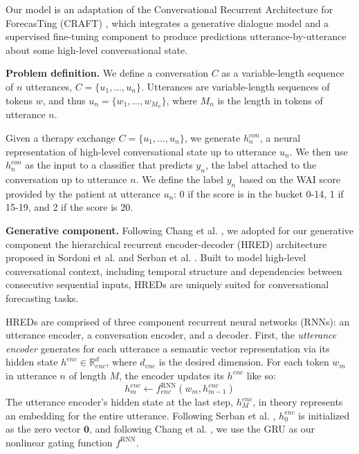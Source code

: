 \documentclass{article}
\begin{document}



Our model is an adaptation of the Conversational Recurrent Architecture for ForecasTing (CRAFT) \cite{Chang-Trouble:19}, which integrates a generative dialogue model and a supervised fine-tuning component to produce predictions utterance-by-utterance about some high-level conversational state.

\textbf{Problem definition.} We define a conversation $C$ as a variable-length sequence of $n$ utterances, $C=\{u_1,...,u_n\}$. Utterances are variable-length sequences of tokens $w$, and thus $u_n=\{w_1,...,w_{M_n}\}$, where $M_n$ is the length in tokens of utterance $n$.

Given a therapy exchange $C=\{u_1,...,u_n\}$, we generate $h^{con}_n$, a neural representation of high-level conversational state up to utterance $u_n$. We then use $h^{con}_n$ as the input to a classifier that predicts $y_n$, the label attached to the conversation up to utterance $n$. We define the label $y_n$ based on the WAI score provided by the patient at utterance $u_n$: 0 if the score is in the bucket 0-14, 1 if 15-19, and 2 if the score is 20.

\textbf{Generative component.} Following Chang et al. \citeyear{Chang-Trouble:19}, we adopted for our generative component the hierarchical recurrent encoder-decoder (HRED) architecture proposed in Sordoni et al. \citeyear{sordoni2015hierarchical} and Serban et al. \citeyear{serban2016building}. Built to model high-level conversational context, including temporal structure and dependencies between consecutive sequential inputs, HREDs are uniquely suited for conversational forecasting tasks. 

HREDs are comprised of three component recurrent neural networks (RNNs): an utterance encoder, a conversation encoder, and a decoder. First, the \textit{utterance encoder} generates for each utterance a semantic vector representation via its hidden state $h^{enc} \in \mathbb{R}^d_{enc}$, where $d_{enc}$ is the desired dimension. For each token $w_m$ in utterance $n$ of length $M$, the encoder updates its $h^{enc}$ like so:
\begin{equation}
  h^{enc}_m \gets f^{\mathrm{RNN}}_{enc}(w_{m}, h^{enc}_{m-1})
\end{equation}
The utterance encoder's hidden state at the last step, $h^{enc}_{M}$, in theory represents an embedding for the entire utterance. Following Serban et al. \citeyear{serban2016building}, $h^{enc}_{0}$ is initialized as the zero vector $\mathbf{0}$, and following Chang et al. \citeyear{Chang-Trouble:19}, we use the GRU \cite{cho2014learning} as our nonlinear gating function $f^{\mathrm{RNN}}$.
\end{document}
